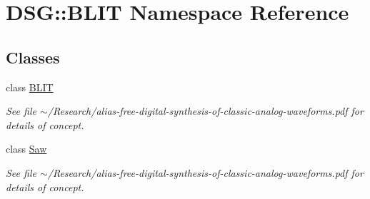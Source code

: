 \hypertarget{namespaceDSG_1_1BLIT}{\section{D\-S\-G\-:\-:B\-L\-I\-T Namespace Reference}
\label{namespaceDSG_1_1BLIT}
}
\subsection*{Classes}
\begin{DoxyCompactItemize}
\item 
class \hyperlink{classDSG_1_1BLIT_1_1BLIT}{B\-L\-I\-T}
\begin{DoxyCompactList}\small\item\em See file $\sim$/\-Research/alias-\/free-\/digital-\/synthesis-\/of-\/classic-\/analog-\/waveforms.pdf for details of concept. \end{DoxyCompactList}\item 
class \hyperlink{classDSG_1_1BLIT_1_1Saw}{Saw}
\begin{DoxyCompactList}\small\item\em See file $\sim$/\-Research/alias-\/free-\/digital-\/synthesis-\/of-\/classic-\/analog-\/waveforms.pdf for details of concept. \end{DoxyCompactList}\end{DoxyCompactItemize}
